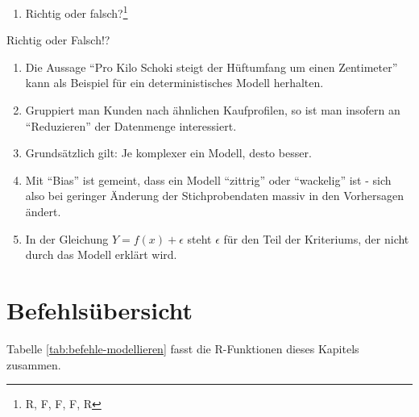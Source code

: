 \documentclass[12pt,ngerman,]{book}
\providecommand{\tightlist}{%
  \setlength{\itemsep}{0pt}\setlength{\parskip}{0pt}}
\let\rmarkdownfootnote\footnote%
\def\footnote{\protect\rmarkdownfootnote}
\theoremstyle{definition}
\theoremstyle{definition}
\theoremstyle{remark}
\let\BeginKnitrBlock\begin \let\EndKnitrBlock\end
\begin{document}
\begin{enumerate}
\def\labelenumi{\arabic{enumi}.}
\setcounter{enumi}{3}
\tightlist
\item
  Richtig oder falsch?\footnote{R, F, F, F, R}
\end{enumerate}

\BeginKnitrBlock{rmdexercises}
Richtig oder Falsch!?

\begin{enumerate}
\def\labelenumi{\arabic{enumi}.}
\tightlist
\item
  Die Aussage ``Pro Kilo Schoki steigt der Hüftumfang um einen
  Zentimeter'' kann als Beispiel für ein deterministisches Modell
  herhalten.
\item
  Gruppiert man Kunden nach ähnlichen Kaufprofilen, so ist man insofern
  an ``Reduzieren'' der Datenmenge interessiert.
\item
  Grundsätzlich gilt: Je komplexer ein Modell, desto besser.
\item
  Mit ``Bias'' ist gemeint, dass ein Modell ``zittrig'' oder
  ``wackelig'' ist - sich also bei geringer Änderung der
  Stichprobendaten massiv in den Vorhersagen ändert.
\item
  In der Gleichung \(Y=f(x)+\epsilon\) steht \(\epsilon\) für den Teil
  der Kriteriums, der nicht durch das Modell erklärt wird.
\end{enumerate}
\EndKnitrBlock{rmdexercises}

\section{Befehlsübersicht}\label{befehlsubersicht-5}

Tabelle \ref{tab:befehle-modellieren} fasst die R-Funktionen dieses
Kapitels zusammen.
\end{document}
